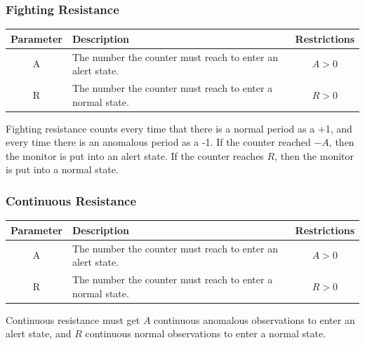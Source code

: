\documentclass[12pt]{ucthesis}
\begin{document}
\subsubsection{Fighting Resistance}
\begin{table}[H]
   \begin{center}
      \begin{tabular}{|c|p{9cm}|c|}
         \hline
            Parameter & Description & Restrictions \\
         \hline
            A & The number the counter must reach to enter an alert state. & $ A > 0 $ \\
         \hline
            R & The number the counter must reach to enter a normal state. & $ R > 0 $ \\
         \hline
      \end{tabular}
   \end{center}
\end{table}

Fighting resistance counts every time that there is a normal period as a +1, and every time there is 
an anomalous period as a -1. If the counter reached $-A$, then the monitor is put into an alert state.
If the counter reaches $R$, then the monitor is put into a normal state.

\subsubsection{Continuous Resistance}
\begin{table}[H]
   \begin{center}
      \begin{tabular}{|c|p{9cm}|c|}
         \hline
            Parameter & Description & Restrictions \\
         \hline
            A & The number the counter must reach to enter an alert state. & $ A > 0 $ \\
         \hline
            R & The number the counter must reach to enter a normal state. & $ R > 0 $ \\
         \hline
      \end{tabular}
   \end{center}
\end{table}

Continuous resistance must get $A$ continuous anomalous observations to enter an alert state, and $R$ continuous normal
observations to enter a normal state. 
\end{document}
